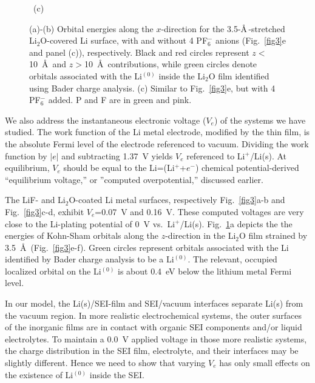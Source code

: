 \documentclass[prb,preprint,amsmath,amssymb]{revtex4}
\begin{document}
\begin{figure}
\centerline{\hbox{ \epsfxsize=2.20in  \hspace*{0.1in}
	 \epsfxsize=2.40in  (c) }}
\caption[]
{\label{fig4} \noindent
(a)-(b) Orbital energies along the $x$-direction for the 3.5-\AA\,-stretched
Li$_2$O-covered Li surface, with and without 4 PF$_6^-$ anions
(Fig.~\ref{fig3}e and panel (c)), respectively.  Black and red circles
represent $z$$<$10~\AA\, and $z$$>$10~\AA\, contributions, while green
circles denote orbitals associated with the Li$^{(0)}$ inside the Li$_2$O
film identified using Bader charge analysis.  (c) Similar to Fig.~\ref{fig3}e,
but with 4 PF$_6^-$ added.  P and F are in green and pink.
}
\end{figure}

We also address the instantaneous electronic voltage ($V_e$) of the systems
we have studied.  The work function of the Li metal electrode, modified by
the thin film, is the absolute Fermi level of the electrode referenced to
vacuum.  Dividing the work function by $|e|$ and subtracting 1.37~V yields
$V_e$ referenced to Li$^+$/Li(s).\cite{solid} At equilibrium, $V_e$ should
be equal to the Li=(Li$^+$+$e^-$) chemical potential-derived ``equilibrium
voltage,'' or ''computed overpotential,'' discussed earlier.

The LiF- and Li$_2$O-coated Li metal surfaces, respectively Fig.~\ref{fig3}a-b
and Fig.~\ref{fig3}c-d, exhibit $V_e$=0.07~V and 0.16~V.  These computed
voltages are very close to the Li-plating potential of 0~V vs.~Li$^+$/Li(s).
Fig.~\ref{fig4}a depicts the the energies of Kohn-Sham orbitals along the
$z$-direction in the Li$_2$O film strained by 3.5~\AA\, (Fig.~\ref{fig3}e-f).
Green circles represent orbitals associated with the Li identified by Bader
charge analysis to be a Li$^{(0)}$.  The relevant, occupied localized orbital
on the Li$^{(0)}$ is about 0.4~eV below the lithium metal Fermi level.

In our model, the Li(s)/SEI-film and SEI/vacuum interfaces
separate Li(s) from the vacuum region.  In more realistic electrochemical
systems, the outer surfaces of the inorganic films are in contact with
organic SEI components and/or liquid electrolytes.  To maintain a 0.0~V
applied voltage in those more realistic systems, the charge distribution in
the SEI film, electrolyte, and their interfaces may be slightly different.
Hence we need to show that varying $V_e$ has only small effects on the 
existence of Li$^{(0)}$ inside the SEI.  
\end{document}
